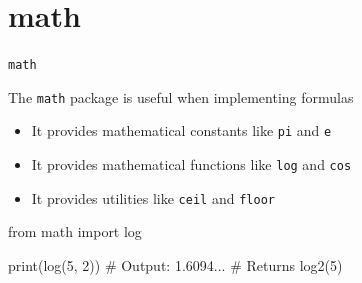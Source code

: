 \section{math}

\begin{frame}[plain]
    \sectionpage
\end{frame}

\begin{frame}[fragile]{\texttt{math}}

    The \texttt{math} package is useful when implementing formulas

    \begin{itemize}

        \item It provides mathematical constants like \texttt{pi} and \texttt{e}
        \item It provides mathematical functions like \texttt{log} and \texttt{cos}
        \item It provides utilities like \texttt{ceil} and \texttt{floor}

    \end{itemize}

    \begin{pythoncode}

from math import log

print(log(5, 2))
# Output: 1.6094...
# Returns log2(5)

    \end{pythoncode}


\end{frame}



